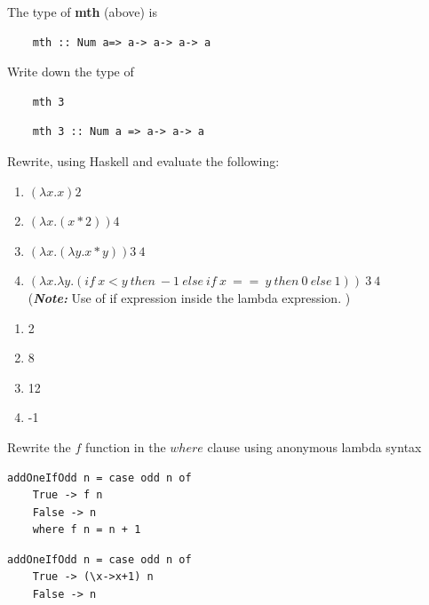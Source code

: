 \documentclass{article}
\begin{document}
\begin{exercise}
  The type of \textbf{mth} (above) is  \begin{lstlisting}
    mth :: Num a=> a-> a-> a-> a
  \end{lstlisting}
  Write down the type of 
  \begin{lstlisting}
    mth 3
  \end{lstlisting} 
\end{exercise}
\begin{solution}
  \begin{lstlisting}
    mth 3 :: Num a => a-> a-> a
  \end{lstlisting} 
\end{solution}
\pagebreak
\begin{exercise}

 
Rewrite, using Haskell and evaluate the following: 
\begin{enumerate}
\item $(\lambda x.x) 2$
\item $(\lambda x . (x*2) ) 4$
\item $ (\lambda x . (\lambda y. x*y) ) 3 \ 4$
\item$ (\lambda x . \lambda y .( if \ x < y \ then \ -1\  else\  if\  x\  ==\ y\  then\  0\  else\  1)) \ 3\  4$\\
(\textbf{\textit{Note:}} Use of if expression inside the lambda expression. )

\end{enumerate}
\end{exercise}
\begin{solution}
\begin{enumerate}
\item 2
\item 8
\item 12
\item -1
\end{enumerate}
\end{solution}
\begin{exercise}
Rewrite the $f$ function in the $where$ clause using anonymous lambda syntax 
\begin{lstlisting}
addOneIfOdd n = case odd n of 
    True -> f n 
    False -> n 
    where f n = n + 1
\end{lstlisting}
\end{exercise}
\begin{solution}
  \begin{lstlisting}
addOneIfOdd n = case odd n of 
    True -> (\x->x+1) n 
    False -> n 
    \end{lstlisting}
\end{solution}
\end{document}
